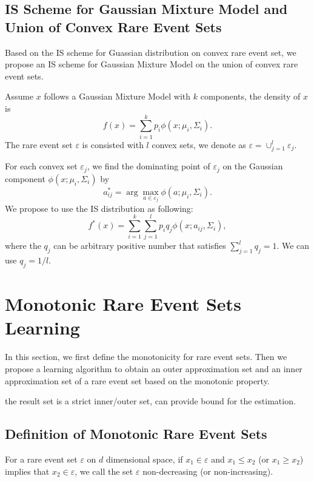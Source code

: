 \documentclass[conference]{IEEEtran}
\begin{document}
\subsection{IS Scheme for Gaussian Mixture Model and Union of Convex Rare Event Sets}
Based on the IS scheme for Guassian distribution on convex rare event set, we propose an IS scheme for Gaussian Mixture Model on the union of convex rare event sets. 
  
Assume $x$ follows a Gaussian Mixture Model with $k$ components, the density of $x$ is \begin{equation}
	f(x)=\sum_{i=1}^{k}p_i \phi(x;\mu_i,\Sigma_i).
	\label{eq:gmm_density}
\end{equation}
The rare event set $\varepsilon$ is consisted with $l$ convex sets, we denote as $\varepsilon = \cup_{j=1}^{l} \varepsilon_j$.

For each convex set $\varepsilon_j$, we find the dominating point of $\varepsilon_j$ on the Gaussian component $\phi(x;\mu_i,\Sigma_i)$ by \begin{equation}
	a_{ij}^*=\arg \max_{a\in \varepsilon_j} \phi(a;\mu_i,\Sigma_i).
\end{equation}
We propose to use the IS distribution as following:\begin{equation}
	f^*(x)=\sum_{i=1}^{k} \sum_{j=1}^{l} p_i q_j \phi(x;a_{ij},\Sigma_i),
\end{equation}
where the $q_j$ can be arbitrary positive number that satisfies $\sum_{j=1}^{l} q_j=1$. We can use $q_j={1}/{l}$.


\section{Monotonic Rare Event Sets Learning}\label{sec:monotone}
In this section, we first define the monotonicity for rare event sets. Then we propose a learning algorithm to obtain an outer approximation set and an inner approximation set of a rare event set based on the monotonic property.

the result set is a strict inner/outer set, can provide bound for the estimation.
\subsection{Definition of Monotonic Rare Event Sets}
For a rare event set $\varepsilon$ on $d$ dimensional space, if $x_1 \in \varepsilon$ and $x_1 \leq x_2$ (or $x_1 \geq x_2$) implies that $x_2 \in \varepsilon$, we call the set $\varepsilon$ non-decreasing (or non-increasing).
\end{document}
